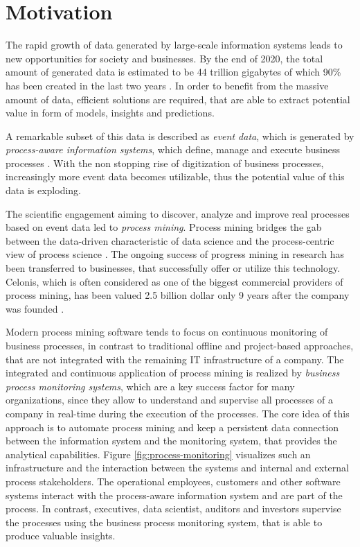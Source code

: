 
\section{Motivation}

The rapid growth of data generated by large-scale information systems leads to new opportunities for  society and businesses. 
By the end of 2020, the total amount of generated data is estimated to be 44 trillion gigabytes of which 90\% has been created in the last two years \cite{datagrowth}.
In order to benefit from the massive amount of data, efficient solutions are required, that are able to extract potential value in form of models, insights and predictions.

A remarkable subset of this data is described as \textit{event data}, which is generated by \textit{process-aware information systems}, which define, manage and execute business processes \cite{DBLP:journals/topnoc/Aalst09}.
With the non stopping rise of digitization of business processes, increasingly more event data becomes utilizable, thus the potential value of this data is exploding.

The scientific engagement aiming to discover, analyze and improve real processes based on event data led to \textit{process mining}. Process mining bridges the gab between the data-driven characteristic of data science and the process-centric view of process science \cite{DBLP:books/sp/Aalst16}.
The ongoing success of progress mining in research has been transferred to businesses, that successfully offer or utilize this technology.
Celonis, which is often considered as one of the biggest commercial providers of process mining, has been valued 2.5 billion dollar only 9 years after the company was founded \cite{celonis}.

Modern process mining software tends to focus on continuous monitoring of business processes, in contrast to traditional offline and project-based approaches, that are not integrated with the remaining IT infrastructure of a company.
The integrated and continuous application of process mining is realized by \textit{business process monitoring systems}, which are a key success factor for many organizations, since they allow to understand and supervise all processes of a company in real-time during the execution of the processes.
The core idea of this approach is to automate process mining and keep a persistent data connection between the information system and the monitoring system, that provides the analytical capabilities.
Figure \ref{fig:process-monitoring} visualizes such an infrastructure and the interaction between the systems and internal and external process stakeholders.
The operational employees, customers and other software systems interact with the process-aware information system and are part of the process.
In contrast, executives, data scientist, auditors and investors supervise the processes using the business process monitoring system, that is able to produce valuable insights.

